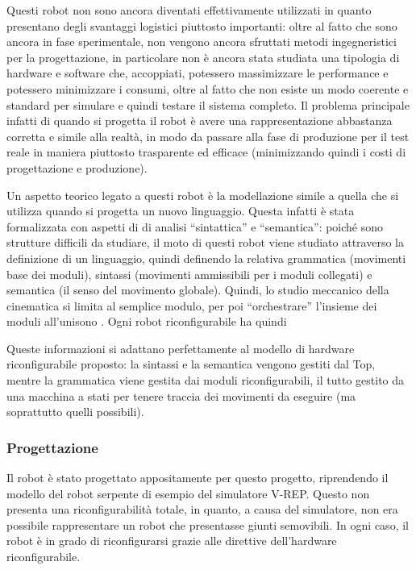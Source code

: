 \documentclass[11pt]{article} %
\begin{document}
Questi robot non sono ancora diventati effettivamente utilizzati in quanto presentano degli svantaggi logistici piuttosto importanti: oltre al fatto che sono ancora in fase sperimentale, non vengono ancora sfruttati metodi ingegneristici per la progettazione, in particolare non è ancora stata studiata una tipologia di hardware e software che, accoppiati, potessero massimizzare le performance e potessero minimizzare i consumi, oltre al fatto che non esiste un modo coerente e standard per simulare e quindi testare il sistema completo.
Il problema principale infatti di quando si progetta il robot è avere una rappresentazione abbastanza corretta e simile alla realtà, in modo da passare alla fase di produzione per il test reale in maniera piuttosto trasparente ed efficace (minimizzando quindi i costi di progettazione e produzione).

Un aspetto teorico legato a questi robot è la modellazione simile a quella che si utilizza quando si progetta un nuovo linguaggio. Questa infatti è stata formalizzata con aspetti di di analisi ``sintattica'' e ``semantica'': poiché sono strutture difficili da studiare, il moto di questi robot viene studiato attraverso la definizione di un linguaggio, quindi definendo la relativa grammatica (movimenti base dei moduli), sintassi (movimenti ammissibili per i moduli collegati) e semantica (il senso del movimento globale). Quindi, lo studio meccanico della cinematica si limita al semplice modulo, per poi ``orchestrare'' l'insieme dei moduli all'unisono \cite{robot_syntax}.
Ogni robot riconfigurabile ha quindi

Queste informazioni si adattano perfettamente al modello di hardware riconfigurabile proposto: la sintassi e la semantica vengono gestiti dal Top, mentre la grammatica viene gestita dai moduli riconfigurabili, il tutto gestito da una macchina a stati per tenere traccia dei movimenti da eseguire (ma soprattutto quelli possibili).

\subsubsection{Progettazione}

Il robot è stato progettato appositamente per questo progetto, riprendendo il modello del robot serpente di esempio del simulatore V-REP. Questo non presenta una riconfigurabilità totale, in quanto, a causa del simulatore, non era possibile rappresentare un robot che presentasse giunti semovibili. In ogni caso, il robot è in grado di riconfigurarsi grazie alle direttive dell'hardware riconfigurabile.
\end{document}

